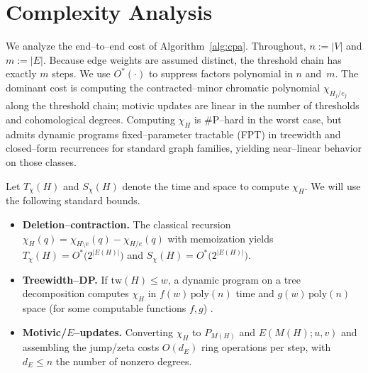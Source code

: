\documentclass[runningheads]{llncs}
\begin{document}




















\section{Complexity Analysis}
\label{sec:complexity}

We analyze the end–to–end cost of Algorithm~\ref{alg:cpa}. Throughout, $n:=|V|$
and $m:=|E|$. Because edge weights are assumed distinct, the threshold chain has
exactly $m$ steps. We use $O^\ast(\cdot)$ to suppress factors polynomial in $n$
and~$m$. 
The dominant cost is computing the contracted–minor chromatic polynomial 
$\chi_{H_j/e_j}$ along the threshold chain; motivic updates are linear in the 
number of thresholds and cohomological degrees.
Computing $\chi_H$ is \#P–hard in the worst case, but admits dynamic programs fixed–parameter
tractable (FPT) in treewidth and closed–form recurrences for standard graph families,
yielding near–linear behavior on those classes.

Let $T_\chi(H)$ and $S_\chi(H)$ denote the time and space to compute $\chi_H$.
We will use the following standard bounds.
\begin{itemize}
  \item \textbf{Deletion–contraction.} The classical recursion
  $\chi_H(q)=\chi_{H\setminus e}(q)-\chi_{H/e}(q)$ with memoization yields
  $T_\chi(H)=O^\ast\!\big(2^{|E(H)|}\big)$ and $S_\chi(H)=O^\ast\!\big(2^{|E(H)|}\big)$.
  \item \textbf{Treewidth–DP.} If $\mathrm{tw}(H)\le w$, a dynamic program on a
  tree decomposition computes $\chi_H$ in $f(w)\,\mathrm{poly}(n)$ time and
  $g(w)\,\mathrm{poly}(n)$ space (for some computable functions $f,g$) \cite{Noble1998,Cygan2015}.
  \item \textbf{Motivic/$E$–updates.} Converting $\chi_H$ to $P_{M(H)}$ and
  $E(M(H);u,v)$ and assembling the jump/zeta costs $O(d_E)$ ring operations per
  step, with $d_E\le n$ the number of nonzero degrees.
\end{itemize}
\end{document}
